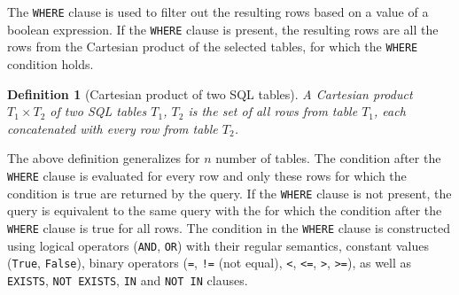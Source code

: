 \documentclass[magisterska,en]{pracamgr}
\newtheorem{defi}{Definition}[section]
\newcommand{\code}[1]{\texttt{#1}}
\begin{document}
The \code{WHERE} clause is used to filter out the resulting rows based on a value of a boolean expression. If the \code{WHERE} clause is present, the resulting rows are all the rows from the Cartesian product of the selected tables, for which the \code{WHERE} condition holds.
\begin{defi}[Cartesian product of two SQL tables]
A \emph{Cartesian product} $T_1 \times T_2$ of two SQL tables $T_1$, $T_2$ is the set of all rows from table $T_1$, each concatenated with every row from table $T_2$.
\end{defi}
The above definition generalizes for $n$ number of tables. The condition after the \code{WHERE} clause is evaluated for every row and only these rows for which the condition is true are returned by the query.
If the \code{WHERE} clause is not present, the query is equivalent to the same query with the for which the condition after the \code{WHERE} clause is true for all rows.
The condition in the \code{WHERE} clause is constructed using logical operators (\code{AND}, \code{OR}) with their regular semantics, constant values (\code{True}, \code{False}), binary operators (\code{=}, \code{!=} (not equal), \code{<}, \code{<=}, \code{>}, \code{>=}), as well as \code{EXISTS}, \code{NOT EXISTS}, \code{IN} and \code{NOT IN} clauses.
\end{document}
